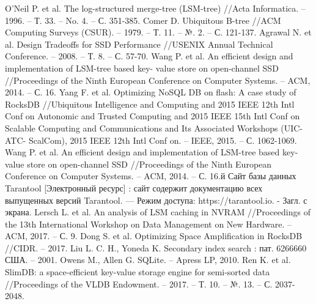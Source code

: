 \documentclass[a4paper,hidelinks,12pt]{article}
\begin{document}
\begin{thebibliography}{9}

 O’Neil P. et al. The log-structured merge-tree (LSM-tree) //Acta Informatica. – 1996. – Т. 33. – No. 4. – С. 351-385.
 Comer D. Ubiquitous B-tree //ACM Computing Surveys (CSUR). – 1979. – Т. 11. – №. 2. – С. 121-137.
 Agrawal N. et al. Design Tradeoffs for SSD Performance //USENIX Annual Technical Conference. – 2008. – Т. 8. – С. 57-70.
 Wang P. et al. An efficient design and implementation of LSM-tree based key- value store on open-channel SSD //Proceedings of the Ninth European Conference on Computer Systems. – ACM, 2014. – С. 16.
 Yang F. et al. Optimizing NoSQL DB on flash: A case study of RocksDB //Ubiquitous Intelligence and Computing and 2015 IEEE 12th Intl Conf on Autonomic and Trusted Computing and 2015 IEEE 15th Intl Conf on Scalable Computing and Communications and Its Associated Workshops (UIC-ATC- ScalCom), 2015 IEEE 12th Intl Conf on. – IEEE, 2015. – С. 1062-1069.
 Wang P. et al. An efficient design and implementation of LSM-tree based key- value store on open-channel SSD //Proceedings of the Ninth European Conference on Computer Systems. – ACM, 2014. – С. 16.й
 Сайт базы данных Tarantool [Электронный ресурс] : сайт содержит документацию всех выпущенных версий Tarantool. — Режим доступа: https://tarantool.io. - Загл. с экрана.
 Lersch L. et al. An analysis of LSM caching in NVRAM //Proceedings of the 13th International Workshop on Data Management on New Hardware. – ACM, 2017. – С. 9.
 Dong S. et al. Optimizing Space Amplification in RocksDB //CIDR. – 2017.
 Liu L. C. H., Yoneda K. Secondary index search : пат. 6266660 США. – 2001.
 Owens M., Allen G. SQLite. – Apress LP, 2010.
 Ren K. et al. SlimDB: a space-efficient key-value storage engine for semi-sorted data //Proceedings of the VLDB Endowment. – 2017. – Т. 10. – №. 13. – С. 2037-2048.

\end{thebibliography}
\end{document}
